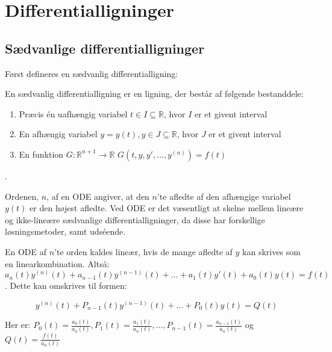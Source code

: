\chapter{Differentialligninger}

\section{Sædvanlige differentialligninger}
Først defineres en sædvanlig differentialligning:
\begin{definition}
En sædvanlig differentialligning er en ligning, der består af følgende bestanddele:
\begin{enumerate}
    \item Præcis én uafhængig variabel $t \in I \subseteq \mathbb{R}$, hvor $I$ er et givent interval
    \item En afhængig variabel $y = y(t), y\in J \subseteq \mathbb{R}$, hvor $J$ er et givent interval
    \item En funktion $G:\mathbb{R}^{n+1} \rightarrow \mathbb{R}$ \hfill \break 
    $G(t,y,y', \hdots , y^{(n)})=f(t)$
\end{enumerate}.
\end{definition}
Ordenen, $n$, af en ODE angiver, at den $n$'te afledte af den afhængige variabel $y(t)$ er den højest afledte. Ved ODE er det væsentligt at skelne mellem lineære og ikke-lineære sædvanlige differentialligninger, da disse har forskellige løsningsmetoder, samt udséende.
\begin{definition}\label{OLDE}En ODE af $n$'te orden kaldes lineær, hvis de mange afledte af $y$ kan skrives som en linearkombination. Altså: \\ 
$$a_{n}(t)y^{(n)}(t)  + a_{n-1}(t)y^{(n-1)}(t)+ \hdots + a_{1}(t)y'(t) + a_{0}(t)y(t) = f(t)$$. \hfill \break
Dette kan omskrives til formen:

$$y^{(n)}(t)+P_{n-1}(t)y^{(n-1)}(t)+\hdots +P_0(t)y(t)=Q(t)$$ 

Her er: $P_0(t)=\frac{a_0(t)}{a_n(t)} , P_1(t)=\frac{a_1(t)}{a_n(t)}, \hdots, P_{n-1}(t)=\frac{a_{n-1}(t)}{a_n(t)}$ og $Q(t)=\frac{f(t)}{a_n(t)}$
\end{definition}

